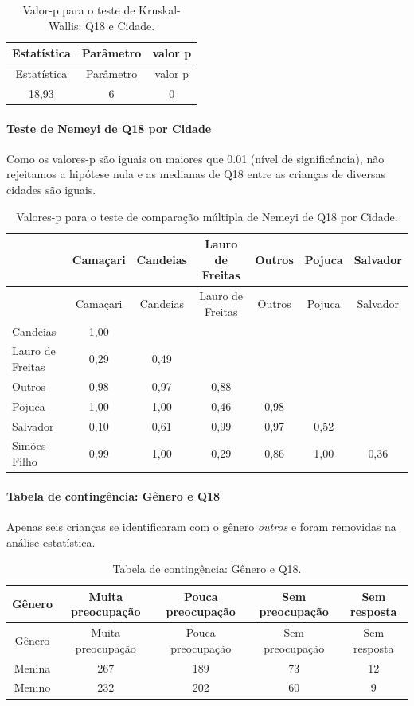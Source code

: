 \documentclass[]{article}
\let\oldparagraph\paragraph
\renewcommand{\paragraph}[1]{\oldparagraph{#1}\mbox{}}
\begin{document}
\begin{longtable}[]{@{}ccc@{}}
\caption{\label{tab:unnamed-chunk-255}Valor-p para o teste de Kruskal-Wallis: Q18 e Cidade.}\tabularnewline
\toprule
Estatística & Parâmetro & valor p\tabularnewline
\midrule
\endfirsthead
\toprule
Estatística & Parâmetro & valor p\tabularnewline
\midrule
\endhead
18,93 & 6 & 0\tabularnewline
\bottomrule
\end{longtable}

\hypertarget{teste-de-nemeyi-de-q18-por-cidade}{%
\paragraph{Teste de Nemeyi de Q18 por Cidade}\label{teste-de-nemeyi-de-q18-por-cidade}}

Como os valores-p são iguais ou maiores que 0.01 (nível de significância), não rejeitamos a hipótese nula e as medianas de Q18 entre as crianças de diversas cidades são iguais.

\begin{longtable}[]{@{}lcccccc@{}}
\caption{\label{tab:unnamed-chunk-257}Valores-p para o teste de comparação múltipla de Nemeyi de Q18 por Cidade.}\tabularnewline
\toprule
& Camaçari & Candeias & Lauro de Freitas & Outros & Pojuca & Salvador\tabularnewline
\midrule
\endfirsthead
\toprule
& Camaçari & Candeias & Lauro de Freitas & Outros & Pojuca & Salvador\tabularnewline
\midrule
\endhead
Candeias & 1,00 & & & & &\tabularnewline
Lauro de Freitas & 0,29 & 0,49 & & & &\tabularnewline
Outros & 0,98 & 0,97 & 0,88 & & &\tabularnewline
Pojuca & 1,00 & 1,00 & 0,46 & 0,98 & &\tabularnewline
Salvador & 0,10 & 0,61 & 0,99 & 0,97 & 0,52 &\tabularnewline
Simões Filho & 0,99 & 1,00 & 0,29 & 0,86 & 1,00 & 0,36\tabularnewline
\bottomrule
\end{longtable}

\cleardoublepage

\hypertarget{tabela-de-continguxeancia-guxeanero-e-q18}{%
\paragraph{Tabela de contingência: Gênero e Q18}\label{tabela-de-continguxeancia-guxeanero-e-q18}}

Apenas seis crianças se identificaram com o gênero \emph{outros} e foram removidas na análise estatística.

\begin{longtable}[]{@{}ccccc@{}}
\caption{\label{tab:unnamed-chunk-258}Tabela de contingência: Gênero e Q18.}\tabularnewline
\toprule
Gênero & Muita preocupação & Pouca preocupação & Sem preocupação & Sem resposta\tabularnewline
\midrule
\endfirsthead
\toprule
Gênero & Muita preocupação & Pouca preocupação & Sem preocupação & Sem resposta\tabularnewline
\midrule
\endhead
Menina & 267 & 189 & 73 & 12\tabularnewline
Menino & 232 & 202 & 60 & 9\tabularnewline
\bottomrule
\end{longtable}
\end{document}

